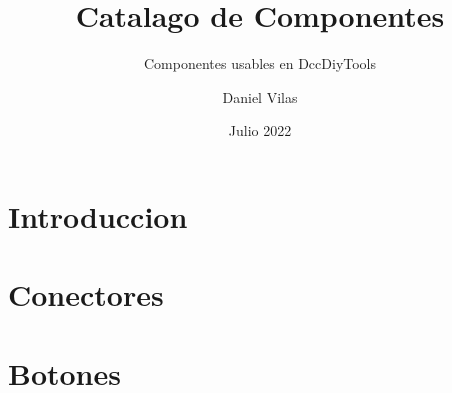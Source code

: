 \documentclass[spanish]{DccDiyTools/DccDiyTools}
\title{Catalago de Componentes}
\subtitle{Componentes usables en DccDiyTools}
\author{Daniel Vilas}
\date{Julio 2022}
\begin{document}
\maketitle

\section{Introduccion}


\newpage
\section{Conectores}


\newpage
\section{Botones}

\end{document}
